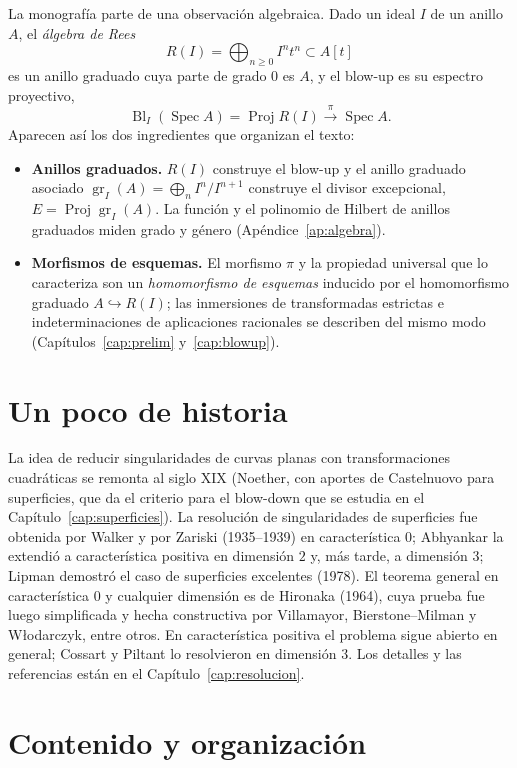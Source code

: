\documentclass[11pt,a4paper,oneside]{book}
\newcommand{\Spec}{\operatorname{Spec}}
\newcommand{\Proj}{\operatorname{Proj}}
\newcommand{\Bl}{\operatorname{Bl}}
\newcommand{\gr}{\operatorname{gr}}
\theoremstyle{plain}
\theoremstyle{definition}
\theoremstyle{remark}
\begin{document}
La monografía parte de una observación algebraica. Dado un ideal $I$ de un anillo $A$, el \emph{álgebra de Rees}
\[
R(I)=\bigoplus_{n\ge0}I^nt^n\subset A[t]
\]
es un anillo graduado cuya parte de grado $0$ es $A$, y el blow-up es su espectro proyectivo,
\[
\Bl_I(\Spec A)=\Proj R(I)\xrightarrow{\ \pi\ }\Spec A.
\]
Aparecen así los dos ingredientes que organizan el texto:
\begin{itemize}
\item \textbf{Anillos graduados.} $R(I)$ construye el blow-up y el anillo graduado asociado $\gr_I(A)=\bigoplus_nI^n/I^{n+1}$ construye el divisor excepcional, $E=\Proj\gr_I(A)$. La función y el polinomio de Hilbert de anillos graduados miden grado y género (Apéndice~\ref{ap:algebra}).
\item \textbf{Morfismos de esquemas.} El morfismo $\pi$ y la propiedad universal que lo caracteriza son un \emph{homomorfismo de esquemas} inducido por el homomorfismo graduado $A\hookrightarrow R(I)$; las inmersiones de transformadas estrictas e indeterminaciones de aplicaciones racionales se describen del mismo modo (Capítulos~\ref{cap:prelim} y~\ref{cap:blowup}).
\end{itemize}

\section{Un poco de historia}

La idea de reducir singularidades de curvas planas con transformaciones cuadráticas se remonta al siglo XIX (Noether, con aportes de Castelnuovo para superficies, que da el criterio para el blow-down que se estudia en el Capítulo~\ref{cap:superficies}). La resolución de singularidades de superficies fue obtenida por Walker y por Zariski (1935--1939) en característica $0$; Abhyankar la extendió a característica positiva en dimensión $2$ y, más tarde, a dimensión $3$; Lipman demostró el caso de superficies excelentes (1978). El teorema general en característica $0$ y cualquier dimensión es de Hironaka (1964), cuya prueba fue luego simplificada y hecha constructiva por Villamayor, Bierstone--Milman y Włodarczyk, entre otros. En característica positiva el problema sigue abierto en general; Cossart y Piltant lo resolvieron en dimensión $3$. Los detalles y las referencias están en el Capítulo~\ref{cap:resolucion}.

\section{Contenido y organización}
\end{document}

